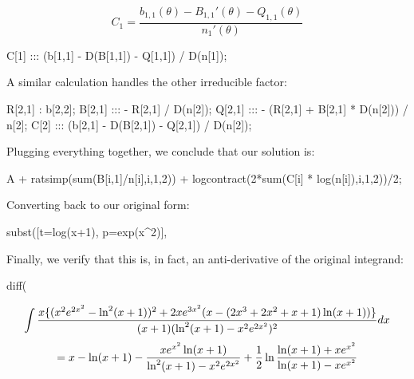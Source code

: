 $$ C_1 = \frac{b_{1,1}(\theta) - B_{1,1}'(\theta) - Q_{1,1}(\theta)}{n_1'(\theta)} $$

\begin{maximacode}
C[1] :::
   (b[1,1] - D(B[1,1]) - Q[1,1]) / D(n[1]);
\end{maximacode}

A similar calculation handles the other irreducible factor:

\begin{maximacode}
R[2,1] : b[2,2];
B[2,1] ::: - R[2,1] / D(n[2]);
Q[2,1] :::
   - (R[2,1] + B[2,1] * D(n[2])) / n[2];
C[2] :::
   (b[2,1] - D(B[2,1]) - Q[2,1]) / D(n[2]);
\end{maximacode}

Plugging everything together, we conclude that our solution is:

\begin{maximacode}
A + ratsimp(sum(B[i,1]/n[i],i,1,2))
   + logcontract(2*sum(C[i] * log(n[i]),i,1,2))/2;
\end{maximacode}

\begin{comment}
\begin{multline*}
\int{{x\{(x^2 \psi^2-\theta^2)^2+2x \psi^3(x-(2x^3+2x^2+x+1)\theta)\}}\over{(x+1)(\theta^2 - x^2\psi^2)^2}} dx \\
= x - \theta -\frac{\frac{x}{2}\psi}{\theta + x \psi} - \frac{\frac{x}{2}\psi}{\theta - x \psi} + \frac{1}{2}\ln(\theta + x\psi)- \frac{1}{2}\ln(\theta - x \psi)
\end{multline*}

$$ = x - \theta -\frac{x \psi \theta}{\theta^2 - x^2 \psi^2} + \frac{1}{2}\ln\frac{\theta + x\psi}{\theta - x \psi}$$
\end{comment}

Converting back to our original form:

\begin{maximacode}
subst([t=log(x+1), p=exp(x^2)], %
\end{maximacode}

Finally, we verify that this is, in fact,
an anti-derivative of the original integrand:

\begin{maximacode}
diff(%
\end{maximacode}

$$\int{{x\{(x^2e^{2x^2}-\ln^2(x+1))^2+2xe^{3x^2}(x-(2x^3+2x^2+x+1)\ln(x+1))\}}\over{(x+1)(\ln^2(x+1) - x^2e^{2x^2})^2}} dx$$
$$= x - \ln(x+1) - {x e^{x^2}\ln(x+1)\over{\ln^2(x+1)-x^2 e^{2x^2}}}
+ {1\over2}\ln\frac{\ln(x+1) + x e^{x^2}}{\ln(x+1) - x e^{x^2}}$$

